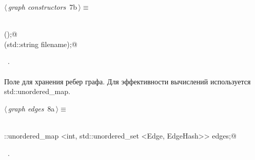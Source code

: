 \documentclass[12pt]{article}
\begin{document}
\begin{flushleft} \small
\begin{minipage}{\linewidth}\label{scrap8}\raggedright\small
{} $\langle\,${\itshape graph constructors}\nobreak\ {\footnotesize {7b}}$\,\rangle\equiv$
\vspace{-1ex}
\begin{list}{}{} \item
\mbox{}\verb@@\\
\mbox{}\verb@Graph();@\\
\mbox{}\verb@Graph(std::string filename);@\\
\mbox{}\verb@@{\NWsep}
\end{list}
\vspace{-1.5ex}
\footnotesize
\begin{list}{}{\setlength{\itemsep}{-\parsep}\setlength{\itemindent}{-\leftmargin}}
\item \NWtxtMacroRefIn\ .

\item{}
\end{list}
\end{minipage}\vspace{4ex}
\end{flushleft}
\paragraph{}
Поле для хранения ребер графа. Для эффективности вычислений используется std::unordered_map. 

\begin{flushleft} \small
\begin{minipage}{\linewidth}\label{scrap9}\raggedright\small
{} $\langle\,${\itshape graph edges}\nobreak\ {\footnotesize {8a}}$\,\rangle\equiv$
\vspace{-1ex}
\begin{list}{}{} \item
\mbox{}\verb@@\\
\mbox{}\verb@std::unordered_map <int, std::unordered_set <Edge, EdgeHash>> edges;@\\
\mbox{}\verb@@{\NWsep}
\end{list}
\vspace{-1.5ex}
\footnotesize
\begin{list}{}{\setlength{\itemsep}{-\parsep}\setlength{\itemindent}{-\leftmargin}}
\item \NWtxtMacroRefIn\ .

\item{}
\end{list}
\end{minipage}\vspace{4ex}
\end{flushleft}
\end{document}
